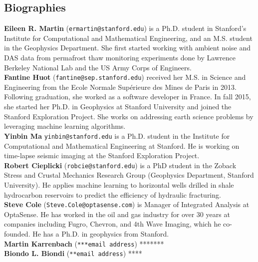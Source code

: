 \documentclass[11pt]{article}
\begin{document}
\subsection*{Biographies}
\small
\vspace{-0.2cm}
\textbf{Eileen R. Martin} (\texttt{ermartin@stanford.edu}) is a Ph.D. student in Stanford's Institute for Computational and Mathematical Engineering, and an M.S. student in the Geophysics Department. She first started working with ambient noise and DAS data from permafrost thaw monitoring experiments done by Lawrence Berkeley National Lab and the US Army Corps of Engineers.
\\
\textbf{Fantine Huot} (\texttt{fantine@sep.stanford.edu}) received her M.S. in Science and Engineering from the Ecole Normale Sup\'erieure des Mines de Paris in 2013. Following graduation, she worked as a software developer in France. In fall 2015, she started her Ph.D. in Geophysics at Stanford University and joined the Stanford Exploration Project. She works on addressing earth science problems by leveraging machine learning algorithms.
\\
\textbf{Yinbin Ma} \texttt{yinbin@stanford.edu} is a Ph.D. student in the Institute for Computational and Mathematical Engineering at Stanford. He is working on time-lapse seismic imaging at the Stanford Exploration Project.
\\
\textbf{Robert Cieplicki} (\texttt{robcie@stanford.edu}) is a PhD student in the Zoback Stress and Crustal Mechanics Research Group (Geophysics Department, Stanford University). He applies machine learning to horizontal wells drilled in shale hydrocarbon reservoirs to predict the efficiency of hydraulic fracturing.
\\
\textbf{Steve Cole} (\texttt{Steve.Cole@optasense.com}) is Manager of Integrated Analysis at OptaSense. He has worked in the oil and gas industry for over 30 years at companies including Fugro, Chevron, and 4th Wave Imaging, which he co-founded. He has a Ph.D. in geophysics from Stanford.
\\
\textbf{Martin Karrenbach} (\texttt{***email address}) *******
\\
\textbf{Biondo L. Biondi} (\texttt{**email address}) ****
\end{document}
